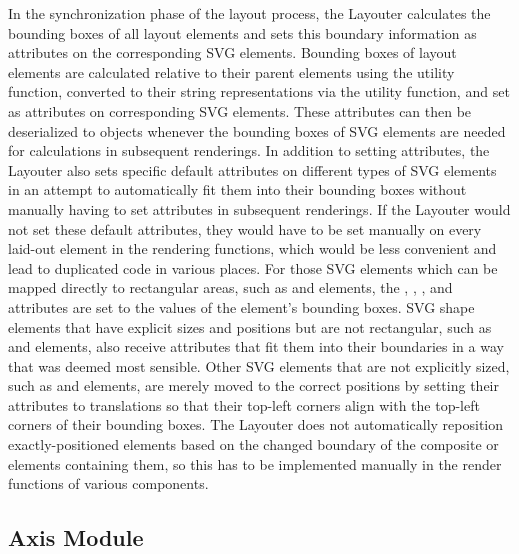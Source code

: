 In the synchronization phase of the layout process, the
Layouter calculates the bounding boxes of all layout
elements and sets this boundary information as attributes on the
corresponding SVG elements. Bounding boxes of layout elements are
calculated relative to their parent elements using the
 utility function, converted to their
string representations via the  utility function,
and set as  attributes on corresponding SVG elements.
These  attributes can then be deserialized to
 objects whenever the bounding boxes of SVG elements are
needed for calculations in subsequent renderings. In addition to
setting  attributes, the Layouter also sets
specific default attributes on different types of SVG elements in an
attempt to automatically fit them into their bounding boxes without
manually having to set attributes in subsequent renderings. If the
Layouter would not set these default attributes, they would
have to be set manually on every laid-out element in the rendering
functions, which would be less convenient and lead to duplicated code
in various places. For those SVG elements which can be mapped directly
to rectangular areas, such as  and 
elements, the , , , and
 attributes are set to the values of the element's
bounding boxes. SVG shape elements that have explicit sizes and
positions but are not rectangular, such as  and
 elements, also receive attributes that fit them into
their boundaries in a way that was deemed most sensible. Other SVG
elements that are not explicitly sized, such as  and
 elements, are merely moved to the correct positions by
setting their  attributes to translations so that
their top-left corners align with the top-left corners of their
bounding boxes. The Layouter does not automatically
reposition exactly-positioned elements based on the changed boundary
of the composite  or  elements containing
them, so this has to be implemented manually in the render functions
of various components.









\subsection{Axis Module}

